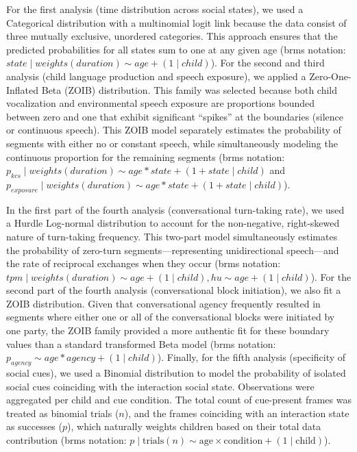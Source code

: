 \documentclass[
  english,
  12pt,
  man,floatsintext]{apa6}
\begin{document}
For the first analysis (time distribution across social states), we used a Categorical distribution with a multinomial logit link because the data consist of three mutually exclusive, unordered categories. This approach ensures that the predicted probabilities for all states sum to one at any given age (brms notation: \(state \mid weights(duration) \sim age + (1 \mid child)\)). For the second and third analysis (child language production and speech exposure), we applied a Zero-One-Inflated Beta (ZOIB) distribution. This family was selected because both child vocalization and environmental speech exposure are proportions bounded between zero and one that exhibit significant ``spikes'' at the boundaries (silence or continuous speech). This ZOIB model separately estimates the probability of segments with either no or constant speech, while simultaneously modeling the continuous proportion for the remaining segments (brms notation: \(p_{kcs} \mid weights(duration) \sim age * state + (1 + state \mid child)\) and \(p_{exposure} \mid weights(duration) \sim age * state + (1 + state \mid child)\)).

In the first part of the fourth analysis (conversational turn-taking rate), we used a Hurdle Log-normal distribution to account for the non-negative, right-skewed nature of turn-taking frequency. This two-part model simultaneously estimates the probability of zero-turn segments---representing unidirectional speech---and the rate of reciprocal exchanges when they occur (brms notation: \(tpm \mid weights(duration) \sim age + (1 \mid child), hu \sim age + (1 \mid child)\)). For the second part of the fourth analysis (conversational block initiation), we also fit a ZOIB distribution. Given that conversational agency frequently resulted in segments where either one or all of the conversational blocks were initiated by one party, the ZOIB family provided a more authentic fit for these boundary values than a standard transformed Beta model (brms notation: \(p_{agency} \sim age * agency + (1 \mid child)\)). Finally, for the fifth analysis (specificity of social cues), we used a Binomial distribution to model the probability of isolated social cues coinciding with the interaction social state. Observations were aggregated per child and cue condition. The total count of cue-present frames was treated as binomial trials (\(n\)), and the frames coinciding with an interaction state as successes (\(p\)), which naturally weights children based on their total data contribution (brms notation: \(p \mid \text{trials}(n) \sim \text{age} \times \text{condition} + (1 \mid \text{child})\)).
\end{document}
